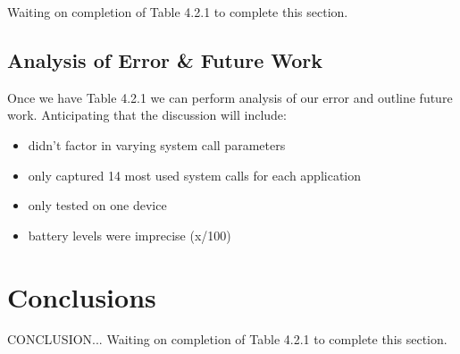 \documentclass[11pt]{article}
\begin{document}
Waiting on completion of Table 4.2.1 to complete this section. 

\subsection{Analysis of Error \& Future Work}
Once we have Table 4.2.1 we can perform analysis of our error and outline future work.  Anticipating that the discussion will
include:
\begin{itemize}
  \item didn't factor in varying system call parameters
  \item only captured 14 most used system calls for each application
  \item only tested on one device
  \item battery levels were imprecise (x/100)
\end{itemize}

\section{Conclusions}

CONCLUSION... Waiting on completion of Table 4.2.1 to complete this section.



\end{document}
